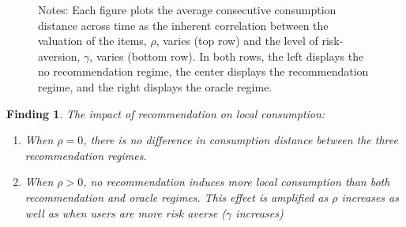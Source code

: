 \documentclass[manuscript]{acmart}
\newtheorem{finding}{Finding}
\begin{document}
\begin{figure}[ht]
\begin{subfigure}{.3\textwidth}
\end{subfigure}%
\caption*{\scriptsize Notes: Each figure plots the average consecutive consumption distance across time as the inherent correlation between the valuation of the items, $\rho$, varies (top row) and the level of risk-aversion, $\gamma$, varies (bottom row). In both rows, the left displays the no recommendation regime, the center displays the recommendation regime, and the right displays the oracle regime.}
\label{fig:local_consumption_vary_rho_gamma}
\end{figure}
\addtocounter{figure}{-1}

\begin{finding}\label{finding_local_consumption}
The impact of recommendation on local consumption:
\begin{enumerate}
\item When $\rho = 0$, there is no difference in consumption distance between the three recommendation regimes.
\item When $\rho > 0$, no recommendation induces more local consumption than both recommendation and oracle regimes. This effect is amplified as $\rho$ increases as well as when users are more risk averse ($\gamma$ increases)
\end{enumerate}
\end{finding}
\end{document}
